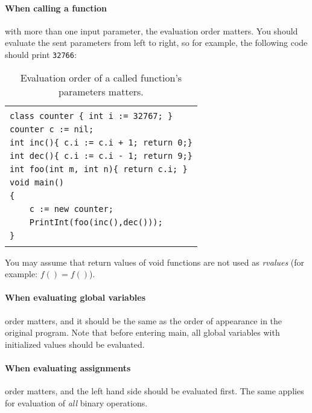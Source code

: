 \documentclass{article}
\begin{document}
\paragraph{When calling a function} with more than one input parameter,
the evaluation order matters. You should evaluate the sent parameters
from left to right, so for example, the following code should print \verb"32766":
\begin{table}[h]
\centering
\begin{tabular}{|l|}
\hline
                                               \\
\verb"class counter { int i := 32767; }"       \\
\verb"counter c := nil;"                       \\
\verb"int inc(){ c.i := c.i + 1; return 0;}"   \\
\verb"int dec(){ c.i := c.i - 1; return 9;}"   \\
\verb"int foo(int m, int n){ return c.i; }"    \\
\verb"void main()"                             \\
\verb"{"                                       \\
\verb"    c := new counter;"                                       \\
\verb"    PrintInt(foo(inc(),dec()));"         \\
\verb"}"                                       \\
                                               \\
\hline
\end{tabular}
\caption{Evaluation order of a called function's parameters matters.
\label{Table_Code_Example_Evaluation_Order_Function_Call}}
\end{table}
You may assume that return values of void functions are not used as \textit{rvalues} (for example: $f() = f()$).
\paragraph{When evaluating global variables}
\label{Paragraph_When_Evaluating_Global_Variables}
order matters,
and it should be the same as the order of appearance in the original program.
Note that before entering main, all global variables with initialized values
should be evaluated.
\paragraph{When evaluating assignments} order matters,
and the left hand side should be evaluated first.
The same applies for evaluation of \textit{all} binary operations.
\end{document}
